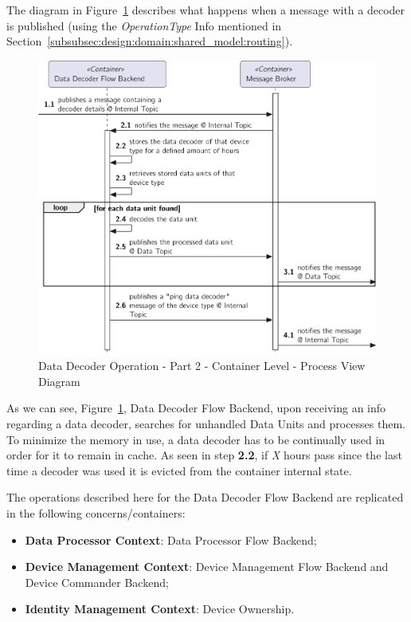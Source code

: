 The diagram in Figure~\ref{fig:design:architecture:platform:container:process:diagram:decoder:2} describes what happens when a message with a decoder is published (using the \textit{OperationType} Info mentioned in Section~\ref{subsubsec:design:domain:shared_model:routing}).

\begin{figure}[H]
   \centering
   \includegraphics[page=1,width=0.8\columnwidth]{assets/diagrams/design/architectural/level2/process/data-decoder-flow-2.pdf}
   \caption[Data Decoder Operation - Part 2 - Container Level - Process View Diagram]{Data Decoder Operation - Part 2 - Container Level - Process View Diagram}
   \label{fig:design:architecture:platform:container:process:diagram:decoder:2}
\end{figure}

As we can see, Figure~\ref{fig:design:architecture:platform:container:process:diagram:decoder:2}, Data Decoder Flow Backend, upon receiving an info regarding a data decoder, searches for unhandled Data Units and processes them.
To minimize the memory in use, a data decoder has to be continually used in order for it to remain in cache. As seen in step \textbf{2.2}, if \textit{X} hours pass since the last time a decoder was used it is evicted from the container internal state.

The operations described here for the Data Decoder Flow Backend are replicated in the following concerns/containers:

\begin{itemize}
   \item \textbf{Data Processor Context}: Data Processor Flow Backend;
   \item \textbf{Device Management Context}: Device Management Flow Backend and Device Commander Backend;
   \item \textbf{Identity Management Context}: Device Ownership.
\end{itemize}

